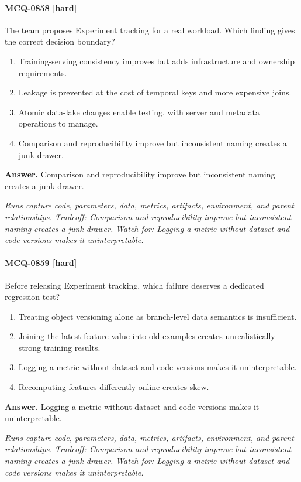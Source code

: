 \paragraph{MCQ-0858 [hard]} The team proposes Experiment tracking for a real workload. Which finding gives the correct decision boundary?
\begin{enumerate}[label=\Alph*.]
\item Training-serving consistency improves but adds infrastructure and ownership requirements.
\item Leakage is prevented at the cost of temporal keys and more expensive joins.
\item Atomic data-lake changes enable testing, with server and metadata operations to manage.
\item Comparison and reproducibility improve but inconsistent naming creates a junk drawer.
\end{enumerate}
\noindent\textbf{Answer.} Comparison and reproducibility improve but inconsistent naming creates a junk drawer.
\par\textit{Runs capture code, parameters, data, metrics, artifacts, environment, and parent relationships. Tradeoff: Comparison and reproducibility improve but inconsistent naming creates a junk drawer. Watch for: Logging a metric without dataset and code versions makes it uninterpretable.}
\paragraph{MCQ-0859 [hard]} Before releasing Experiment tracking, which failure deserves a dedicated regression test?
\begin{enumerate}[label=\Alph*.]
\item Treating object versioning alone as branch-level data semantics is insufficient.
\item Joining the latest feature value into old examples creates unrealistically strong training results.
\item Logging a metric without dataset and code versions makes it uninterpretable.
\item Recomputing features differently online creates skew.
\end{enumerate}
\noindent\textbf{Answer.} Logging a metric without dataset and code versions makes it uninterpretable.
\par\textit{Runs capture code, parameters, data, metrics, artifacts, environment, and parent relationships. Tradeoff: Comparison and reproducibility improve but inconsistent naming creates a junk drawer. Watch for: Logging a metric without dataset and code versions makes it uninterpretable.}
